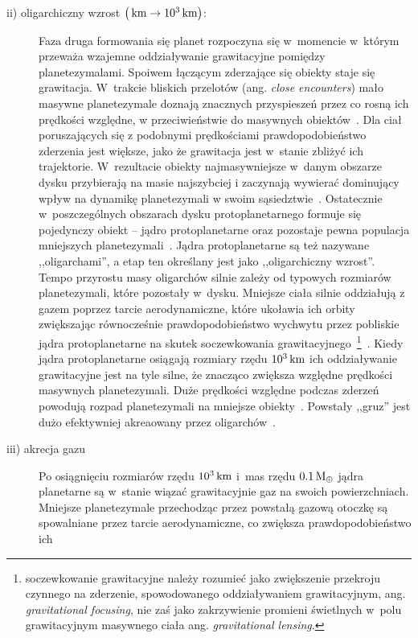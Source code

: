 \begin{description}
\item[ii) oligarchiczny wzrost $\left(\hbox{$\thinspace\textrm{km}$} \rightarrow
   10^3\hbox{$\thinspace\textrm{km}$}\right)$:]
   Faza druga formowania się planet rozpoczyna się w~momencie w~którym przeważa
   wzajemne oddziaływanie grawitacyjne pomiędzy planetezymalami. Spoiwem
   łączącym zderzające się obiekty staje się grawitacja. W~trakcie bliskich
   przelotów (ang. \emph{close encounters}) mało masywne planetezymale doznają
   znacznych przyspieszeń przez co rosną ich prędkości względne, w
   przeciwieństwie do masywnych obiektów~\cite{WS93}. Dla ciał poruszających się z
   podobnymi prędkościami prawdopodobieństwo zderzenia jest większe, jako że
   grawitacja jest w~stanie zbliżyć ich trajektorie. W~rezultacie obiekty
   najmasywniejsze w~danym obszarze dysku przybierają na masie najszybciej i
   zaczynają wywierać dominujący wpływ na dynamikę planetezymali w swoim
   sąsiedztwie~\cite{IM93}. 
   Ostatecznie w~poszczególnych obszarach dysku
   protoplanetarnego formuje się pojedynczy obiekt -- jądro protoplanetarne
   oraz pozostaje pewna populacja mniejszych planetezymali~\cite{KI98}. Jądra
   protoplanetarne są też nazywane ,,oligarchami'', a etap ten określany jest
   jako ,,oligarchiczny wzrost''.
   Tempo przyrostu masy oligarchów silnie zależy od typowych rozmiarów
   planetezymali, które pozostały w~dysku. Mniejsze ciała silnie oddziałują z
   gazem poprzez tarcie aerodynamiczne, które ukoławia ich orbity zwiększając
   równocześnie prawdopodobieństwo wychwytu przez pobliskie jądra
   protoplanetarne na skutek soczewkowania
   grawitacyjnego~\footnote{soczewkowanie grawitacyjne należy rozumieć jako
      zwiększenie przekroju czynnego na zderzenie, spowodowanego oddziaływaniem
   grawitacyjnym, ang. \emph{gravitational focusing}, nie zaś jako zakrzywienie
promieni świetlnych w~polu grawitacyjnym masywnego ciała ang.
\emph{gravitational lensing}.}~\cite{R04}.
   Kiedy jądra protoplanetarne osiągają rozmiary rzędu $10^3\hbox{$\thinspace\textrm{km}$}$ ich oddziaływanie
   grawitacyjne jest na tyle silne, że znacząco zwiększa względne prędkości
   masywnych planetezymali. Duże prędkości względne podczas zderzeń powodują rozpad
   planetezymali na mniejsze obiekty~\cite{KB04}. Powstały ,,gruz'' jest dużo
   efektywniej akreaowany przez oligarchów~\cite{WS93}.
\item[iii) akrecja gazu]
   Po osiągnięciu rozmiarów rzędu $10^3\hbox{$\thinspace\textrm{km}$}$ i~mas rzędu $0.1\hbox{$\mathrm{\thinspace M_{\oplus}}$}$ jądra
   planetarne są w~stanie wiązać grawitacyjnie gaz na swoich powierzchniach.
   Mniejsze planetezymale przechodząc przez powstałą gazową otoczkę są
   spowalniane przez tarcie aerodynamiczne, co zwiększa prawdopodobieństwo ich

\end{description}
